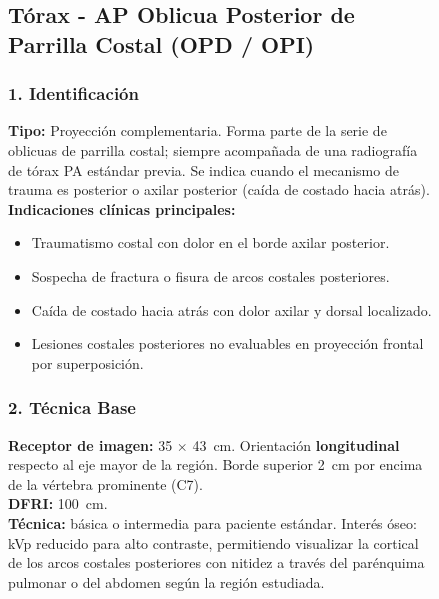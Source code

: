 \begin{figure}
{\clearpage


\subsection{Tórax - AP Oblicua Posterior de Parrilla Costal (OPD / OPI)}

\subsubsection*{1. Identificación}

\textbf{Tipo:} Proyección complementaria. Forma parte de la serie de oblicuas de parrilla costal; siempre acompañada de una radiografía de tórax PA estándar previa. Se indica cuando el mecanismo de trauma es posterior o axilar posterior (caída de costado hacia atrás).\\

\textbf{Indicaciones clínicas principales:}

\begin{itemize}
  \item Traumatismo costal con dolor en el borde axilar posterior.
  \item Sospecha de fractura o fisura de arcos costales posteriores.
  \item Caída de costado hacia atrás con dolor axilar y dorsal localizado.
  \item Lesiones costales posteriores no evaluables en proyección frontal por superposición.
\end{itemize}

\subsubsection*{2. Técnica Base}

\textbf{Receptor de imagen:} 35 $\times$ 43~cm. Orientación \textbf{longitudinal} respecto al eje mayor de la región. Borde superior 2~cm por encima de la vértebra prominente (C7).\\

\textbf{DFRI:} 100~cm.\\

\textbf{Técnica:} básica o intermedia para paciente estándar. Interés óseo: kVp reducido para alto contraste, permitiendo visualizar la cortical de los arcos costales posteriores con nitidez a través del parénquima pulmonar o del abdomen según la región estudiada.\\

}
\end{figure}
